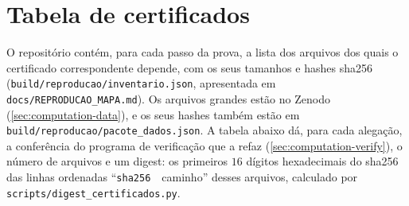 \section{Tabela de certificados}\label{app:certificates}

O repositório contém, para cada passo da prova, a lista dos arquivos dos quais o certificado correspondente
depende, com os seus tamanhos e hashes sha256 (\texttt{build/reproducao/inventario.json}, apresentada em
\texttt{docs/REPRODUCAO\_MAPA.md}). Os arquivos grandes estão no Zenodo (\cref{sec:computation-data}), e os seus hashes
também estão em \texttt{build/reproducao/pacote\_dados.json}. A tabela abaixo dá, para cada alegação, a conferência do
programa de verificação que a refaz (\cref{sec:computation-verify}), o número de arquivos e um digest: os
primeiros $16$ dígitos hexadecimais do sha256 das linhas ordenadas ``\texttt{sha256}~~caminho'' desses arquivos, calculado por
\texttt{scripts/digest\_certificados.py}.

\begin{table}[ht]
\centering
\small

\caption{Certificados da prova, por alegação. O digest identifica o conjunto de arquivos do qual cada alegação depende.}
\label{tab:digests}
\end{table}
